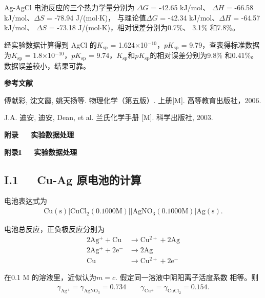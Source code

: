 \documentclass[12pt]{ctexart}
\numberwithin{equation}{section}
\begin{document}
Ag-AgCl 电池反应的三个热力学量分别为 $\Delta G$ = -42.65 kJ/mol、
$\Delta H$ = -66.58 kJ/mol、$\Delta S$ = -78.94 J/(mol$\cdot$K)，
与理论值$\Delta G$ = -42.34 kJ/mol、$\Delta H$ = -64.57 kJ/mol、
$\Delta S$ = -73.18 J/(mol$\cdot$K)，相对误差分别为0.7\%、
3.1\% 和7.8\%。

经实验数据计算得到 AgCl 的$K_{\text{sp}}$ =
1.624$\times$10$^{-10}$，$pK_{\text{sp}}$ = 9.79，查表得标准数据
为$K_{\text{sp}}$ = 1.8$\times$10$^{-10}$，$pK_{\text{sp}}$ =
9.74，$K_{\text{sp}}$和$pK_{\text{sp}}$的相对误差分别为9.8\%
和0.41\%。数据误差较小，结果可靠。


\begin{center}
    \Large\bfseries{参考文献}
\end{center}
\noindent
[1] 傅献彩, 沈文霞, 姚天扬等. 物理化学（第五版）. 上册[M].
高等教育出版社，2006.

\noindent
[2] J.A. 迪安, 迪安, Dean, et al. 兰氏化学手册 [M]. 科学出版社,
2003.

\newpage

\begin{center}
    \LARGE\bfseries{附录~~~实验数据处理}
\end{center}
\begin{center}
    \Large\bfseries{附录I~~~实验数据处理}
\end{center}

\subsection*{I.1~~~Cu-Ag 原电池的计算}

电池表达式为
\begin{align}
    \mathrm{Cu(s)}|\mathrm{CuCl_2}(0.1000 \mathrm{M})
    ||\mathrm{AgNO_3}(0.1000 \mathrm{M})|\mathrm{Ag(s)}.
    \tag{I.1}
\end{align}

电池总反应，正负极反应分别为
\begin{align}
    \mathrm{2 Ag^{+} + Cu }&\mathrm{\longrightarrow Cu^{2+} + 2Ag}
    \tag{I.2} \\
    \mathrm{2 Ag^{+} + 2 e^{-} }&\mathrm{\longrightarrow 2 Ag}
    \tag{I.3} \\
    \mathrm{Cu }&\mathrm{\longrightarrow Cu^{2+} + 2 e^{-}}
    \tag{I.4}
\end{align}

在0.1 M 的溶液里，近似认为$m = c$. 假定同一溶液中阴阳离子活度系数
相等。则
\begin{align}
    \gamma_{\mathrm{Ag^+}} = \gamma_{\mathrm{AgNO_3}} = 0.734
    \qquad
    \gamma_{\mathrm{Cu^+}} = \gamma_{\mathrm{CuCl_2}} = 0.154.
    \tag{I.5}
\end{align}
\end{document}

